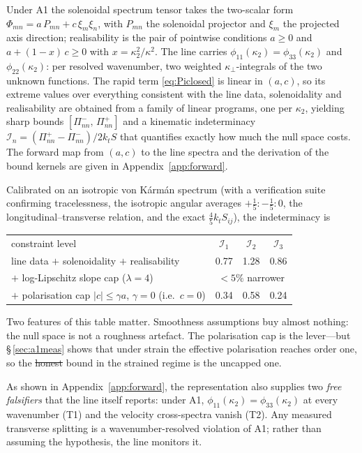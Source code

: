 \documentclass[lineno]{JFM-FLM_Au}
\providecommand{\DIFadd}[1]{{\protect\color{blue}\uwave{#1}}} %
\providecommand{\DIFdel}[1]{{\protect\color{red}\sout{#1}}} %
\providecommand{\DIFaddbegin}{} %
\providecommand{\DIFaddend}{} %
\providecommand{\DIFdelbegin}{} %
\providecommand{\DIFdelend}{} %
\begin{document}
Under A1 the solenoidal spectrum tensor takes the two-scalar form
$\Phi_{mn}=a\,P_{mn}+c\,\xi_m\xi_n$, with $P_{mn}$ the solenoidal projector
and $\xi_m$ the projected axis direction; realisability is the pair of
pointwise conditions $a\ge0$ and $a+(1-x)\,c\ge0$ with
$x=\kappa_2^2/\kappa^2$. The line carries $\phi_{11}(\kappa_2)
=\phi_{33}(\kappa_2)$ and $\phi_{22}(\kappa_2)$: per resolved wavenumber,
two weighted $\kappa_\perp$-integrals of the two unknown functions. The
rapid term \eqref{eq:Piclosed} is linear in $(a,c)$, so its extreme values
over everything consistent with the line data, solenoidality and
realisability are obtained from a family of linear programs, one per
$\kappa_2$, yielding sharp bounds
$[\Pi^{-}_{nn},\,\Pi^{+}_{nn}]$ and a kinematic indeterminacy
$\mathcal I_n=(\Pi^{+}_{nn}-\Pi^{-}_{nn})/2k_tS$ that quantifies exactly
how much the null space costs. The forward map from $(a,c)$ to the line
spectra and the derivation of the bound kernels are given in
Appendix~\ref{app:forward}.

Calibrated on an isotropic von K\'arm\'an spectrum (with a verification
suite confirming tracelessness, the isotropic angular averages
$+\tfrac15:-\tfrac15:0$, the longitudinal--transverse relation, and the
exact $\tfrac45 k_t S_{ij}$), the indeterminacy is
\begin{center}\small
\begin{tabular}{lccc}
constraint level & $\mathcal I_{1}$ & $\mathcal I_{2}$ & $\mathcal I_{3}$\\[1pt]
line data $+$ solenoidality $+$ realisability & 0.77 & 1.28 & 0.86\\
$+$ log-Lipschitz slope cap ($\lambda=4$) & \multicolumn{3}{c}{$<5\%$ narrower}\\
$+$ polarisation cap $|c|\le\gamma a$, $\gamma=0$ (i.e.\ $c=0$) & 0.34 & 0.58 & 0.24\\
\end{tabular}
\end{center}
Two features of this table matter. Smoothness assumptions buy almost
nothing: the null space is not a roughness artefact. The polarisation cap
is the lever---but \S\,\ref{sec:a1meas} shows that under strain the
effective polarisation reaches order one, so the \DIFdelbegin \DIFdel{honest }\DIFdelend \DIFaddbegin \DIFadd{valid }\DIFaddend bound in the strained regime is the uncapped one.

As shown in Appendix~\ref{app:forward}, the representation also supplies two \emph{free falsifiers} that the line itself reports: under A1, $\phi_{11}(\kappa_2)=\phi_{33}(\kappa_2)$ at
every wavenumber (T1) and the velocity cross-spectra vanish (T2). Any
measured transverse splitting is a wavenumber-resolved violation of A1;
rather than assuming the hypothesis, the line monitors it.
\end{document}
